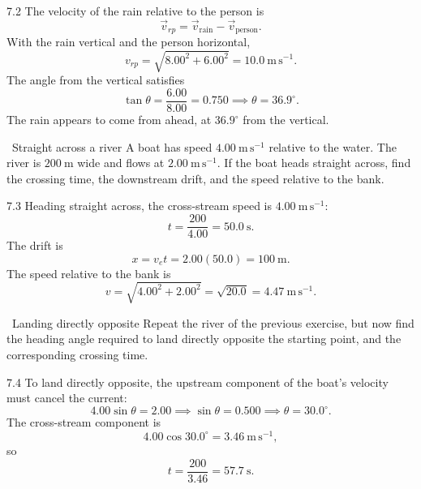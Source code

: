 \begin{tabletworkspace}[6.5cm]
\end{tabletworkspace}

\begin{solution}{7.2}
The velocity of the rain relative to the person is
\[
\vec v_{rp}=\vec v_{\text{rain}}-\vec v_{\text{person}}.
\]
With the rain vertical and the person horizontal,
\[
v_{rp}=\sqrt{8.00^2+6.00^2}=10.0\ \mathrm{m\,s^{-1}}.
\]
The angle from the vertical satisfies
\[
\tan\theta=\frac{6.00}{8.00}=0.750
\implies
\theta=36.9^\circ.
\]
The rain appears to come from ahead, at $36.9^\circ$ from the vertical.
\end{solution}

\begin{exercise}{\warm\ Straight across a river}
A boat has speed $4.00\ \mathrm{m\,s^{-1}}$ relative to the water. The river is
$200\ \mathrm{m}$ wide and flows at $2.00\ \mathrm{m\,s^{-1}}$. If the boat heads
straight across, find the crossing time, the downstream drift, and the speed
relative to the bank.
\end{exercise}

\begin{tabletworkspace}[6.5cm]
\end{tabletworkspace}

\begin{solution}{7.3}
Heading straight across, the cross-stream speed is $4.00\ \mathrm{m\,s^{-1}}$:
\[
t=\frac{200}{4.00}=50.0\ \mathrm{s}.
\]
The drift is
\[
x=v_e t=2.00(50.0)=100\ \mathrm{m}.
\]
The speed relative to the bank is
\[
v=\sqrt{4.00^2+2.00^2}=\sqrt{20.0}=4.47\ \mathrm{m\,s^{-1}}.
\]
\end{solution}

\begin{exercise}{\core\ Landing directly opposite}
Repeat the river of the previous exercise, but now find the heading angle
required to land directly opposite the starting point, and the corresponding
crossing time.
\end{exercise}

\begin{tabletworkspace}[6.5cm]
\end{tabletworkspace}

\begin{solution}{7.4}
To land directly opposite, the upstream component of the boat's velocity must
cancel the current:
\[
4.00\sin\theta=2.00
\implies
\sin\theta=0.500
\implies
\theta=30.0^\circ.
\]
The cross-stream component is
\[
4.00\cos30.0^\circ=3.46\ \mathrm{m\,s^{-1}},
\]
so
\[
t=\frac{200}{3.46}=57.7\ \mathrm{s}.
\]
\end{solution}

